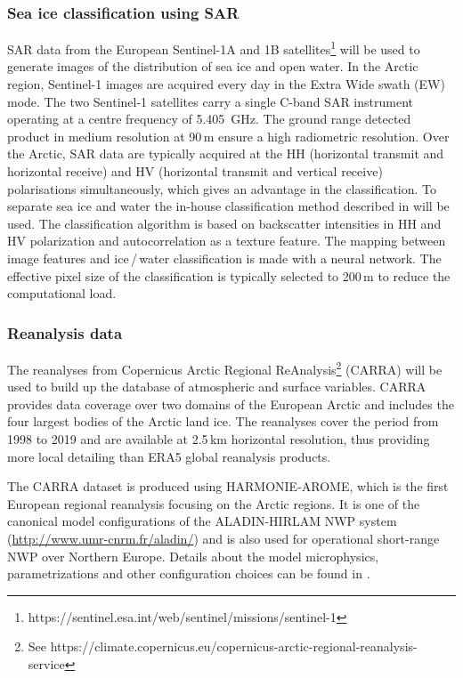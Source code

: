 \documentclass[12pt,oneside,a4paper]{article}
\begin{document}
\subsubsection{Sea ice classification using SAR}
%
\label{sec:sar}
SAR data from the European Sentinel-1A and 1B
satellites\footnote{https://sentinel.esa.int/web/sentinel/missions/sentinel-1}
will be used to generate images of the distribution of sea ice and open water.
In the Arctic region, Sentinel-1 images are acquired every day in the Extra
Wide swath (EW) mode. The two Sentinel-1 satellites carry a single C-band SAR
instrument operating at a centre frequency of 5.405\, GHz. The ground range
detected product in medium resolution at 90\,m ensure a high radiometric
resolution. Over the Arctic, SAR data are typically acquired at the HH
(horizontal transmit and horizontal receive) and HV (horizontal transmit and
vertical receive) polarisations simultaneously, which gives an advantage in the
classification. To separate sea ice and water the in-house classification
method described in \citet{aldenhoff:compa:18} will be used. The classification
algorithm is based on backscatter intensities in HH and HV polarization and
autocorrelation as a texture feature. The mapping between image features and
ice\,/\,water classification is made with a neural network. The effective pixel
size of the classification is typically selected to 200\,m to reduce the
computational load.

\subsubsection{Reanalysis data}
%
\label{sec:harmonie}
The reanalyses from Copernicus Arctic Regional ReAnalysis\footnote{See https://climate.copernicus.eu/copernicus-arctic-regional-reanalysis-service} (CARRA) will be used to build up the database of atmospheric and surface variables. CARRA provides data coverage over two domains of the European Arctic and includes the four largest bodies of the Arctic land ice. The reanalyses cover the period from 1998 to 2019 and are available at 2.5\,km horizontal resolution, thus providing more local detailing than ERA5 global reanalysis products. 

The CARRA dataset is produced using HARMONIE-AROME, which is the first European regional reanalysis focusing on the Arctic regions. It is one of
the canonical model configurations of the ALADIN-HIRLAM NWP system
(\url{http://www.umr-cnrm.fr/aladin/}) and is also used for operational
short-range NWP over Northern Europe. Details about the model
microphysics, parametrizations and other configuration choices can be found in
\citet{bengtsson:2017:harmo}. 
\end{document}
